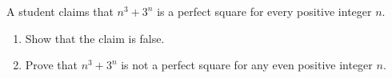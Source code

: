 A student claims that $n^3+3^n$ is a perfect square for every positive integer $n$.
\begin{enumerate}
\item[(a)] Show that the claim is false.
\item[(b)] Prove that $n^3+3^n$ is not a perfect square for any even positive integer $n$.
\end{enumerate}
